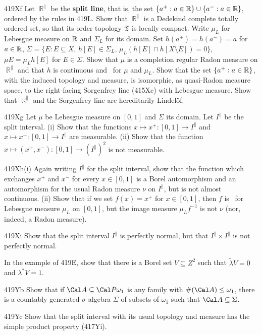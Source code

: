 {\spheader 419Xf Let $\BbbR^{\|}$ be the {\bf split line}, that is, the
set $\{a^+:a\in\Bbb R\}\cup\{a^-:a\in\Bbb R\}$, ordered by the rules in
419L. Show that $\BbbR^{\|}$ is a Dedekind complete totally ordered
set, so that
its order topology $\frak T$ is locally compact.   Write $\mu_L$ for
Lebesgue measure
on $\Bbb R$ and $\Sigma_L$ for its domain.   Set $h(a^+)=h(a^-)=a$ for
$a\in\Bbb R$, $\Sigma
=\{E:E\subseteq X,\,h[E]\in\Sigma_L,\,\mu_L(h[E]\cap h[X\setminus E])=0\}$,
$\mu E=\mu_Lh[E]$ for $E\in\Sigma$.   Show that
$\mu$ is a completion regular Radon measure on $\BbbR^{\|}$ and that
$h$ is continuous and \imp\ for $\mu$ and
$\mu_L$.   Show that the set $\{a^+:a\in\Bbb R\}$, with the induced
topology and measure, is isomorphic, as quasi-Radon measure space, to
the right-facing Sorgenfrey line (415Xc) with Lebesgue measure.   Show
that $\BbbR^{\|}$ and the Sorgenfrey line are hereditarily Lindel\"of.

\spheader 419Xg Let $\mu$ be Lebesgue measure on $[0,1]$ and $\Sigma$
its domain.   Let $I^{\|}$ be the split interval.   (i) Show that the
functions $x\mapsto x^+:[0,1]\to I^{\|}$ and
$x\mapsto x^-:[0,1]\to I^{\|}$ are measurable.
   (ii) Show that the function
$x\mapsto(x^+,x^-):[0,1]\to (I^{\|})^2$ is not measurable.  

\sqheader 419Xh(i) Again writing $I^{\|}$ for the split interval, show
that the function which exchanges $x^+$ and $x^-$ for every $x\in[0,1]$
is a Borel automorphism and an automorphism for the usual Radon measure
$\nu$ on $I^{\|}$, but is not almost continuous.   (ii) Show that
if we set $f(x)=x^+$ for $x\in[0,1]$, then $f$ is \imp\ for Lebesgue
measure $\mu_L$ on $[0,1]$, but the image measure $\mu_Lf^{-1}$ is
not $\nu$ (nor, indeed, a Radon measure).

\spheader 419Xi Show that the split
interval $I^{\|}$ is perfectly normal, but that
$I^{\|}\times I^{\|}$ is not perfectly normal.

In the example of 419E, show that there is a Borel set $V\subseteq Z^2$
such that $\tilde\lambda V=0$ and $\lambda^*V=1$.

\spheader 419Yb
Show that if $\Cal A\subseteq\Cal P\omega_1$ is any family with
$\#(\Cal A)\le\omega_1$, there is a countably generated $\sigma$-algebra
$\Sigma$ of subsets of $\omega_1$ such that $\Cal A\subseteq\Sigma$.

\spheader 419Yc Show that the split interval
with its usual topology and measure has the simple product
property (417Yi).

}%

